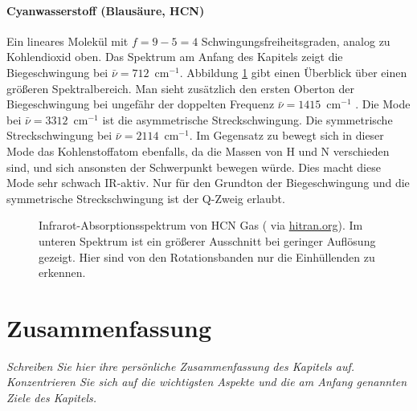 \paragraph{Cyanwasserstoff (Blausäure, HCN)}  
\begin{marginfigure}
\end{marginfigure}
Ein lineares Molekül mit $f=9 - 5 = 4$ Schwingungsfreiheitsgraden, analog zu Kohlendioxid oben. Das Spektrum am Anfang des Kapitels zeigt die Biegeschwingung bei $\bar{\nu} = 712$~cm$^{-1}$.  Abbildung \ref{fig:vib_hcn_all} gibt einen Überblick über einen größeren Spektralbereich. Man sieht zusätzlich den 
ersten Oberton der Biegeschwingung bei ungefähr der doppelten Frequenz  $\bar{\nu} = 1415$~cm$^{-1}$
. Die Mode bei  $\bar{\nu} = 3312$~cm$^{-1}$ ist die  asymmetrische Streckschwingung. Die symmetrische Streckschwingung  bei $\bar{\nu} = 2114$~cm$^{-1}$.
 Im Gegensatz zu  bewegt sich in dieser Mode das Kohlenstoffatom ebenfalls, da die Massen von H und N verschieden sind, und sich ansonsten der  Schwerpunkt bewegen würde. Dies macht diese Mode sehr schwach IR-aktiv.  Nur für den Grundton der Biegeschwingung und die  symmetrische Streckschwingung ist der Q-Zweig erlaubt.

\begin{figure}
\caption{Infrarot-Absorptionsspektrum von HCN Gas  (\cite{Maki_1995_HCN} via \href{https://hitran.org}{hitran.org}). Im unteren Spektrum ist ein größerer Ausschnitt bei geringer Auflösung gezeigt. Hier sind von den Rotationsbanden nur die Einhüllenden zu erkennen.
\label{fig:vib_hcn_all}}
\end{figure}



\newpage

\section{Zusammenfassung}

\textit{Schreiben Sie hier ihre persönliche Zusammenfassung des Kapitels auf. Konzentrieren Sie sich auf die wichtigsten Aspekte und die am Anfang genannten Ziele des Kapitels.}

\vspace*{10cm}




\printbibliography[segment=\therefsegment,heading=subbibliography]
